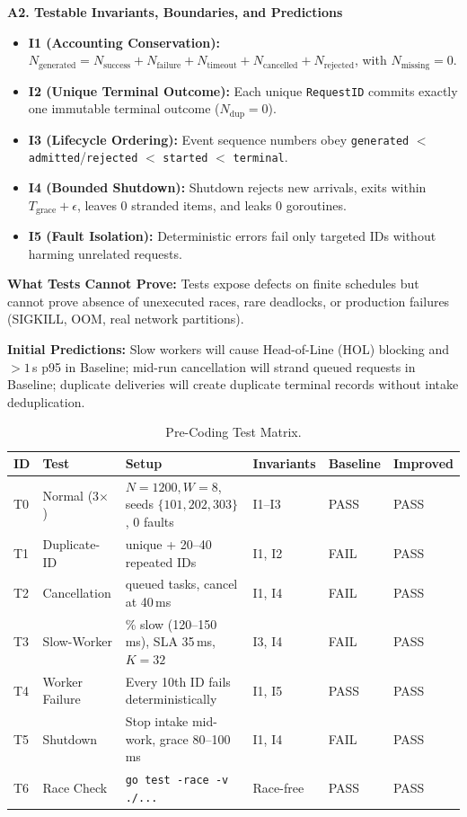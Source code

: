 \documentclass[11pt]{article}
\newcommand{\subhead}[1]{\vspace{0.6em}\noindent\textbf{\large #1}\par\vspace{0.25em}}
\begin{document}
\subhead{A2. Testable Invariants, Boundaries, and Predictions}
\begin{itemize}
    \item \textbf{I1 (Accounting Conservation):} $N_{\text{generated}} = N_{\text{success}} + N_{\text{failure}} + N_{\text{timeout}} + N_{\text{cancelled}} + N_{\text{rejected}}$, with $N_{\text{missing}} = 0$.
    \item \textbf{I2 (Unique Terminal Outcome):} Each unique \texttt{RequestID} commits exactly one immutable terminal outcome ($N_{\text{dup}} = 0$).
    \item \textbf{I3 (Lifecycle Ordering):} Event sequence numbers obey \texttt{generated} $<$ \texttt{admitted}/\texttt{rejected} $<$ \texttt{started} $<$ \texttt{terminal}.
    \item \textbf{I4 (Bounded Shutdown):} Shutdown rejects new arrivals, exits within $T_{\text{grace}}+\epsilon$, leaves 0 stranded items, and leaks 0 goroutines.
    \item \textbf{I5 (Fault Isolation):} Deterministic errors fail only targeted IDs without harming unrelated requests.
\end{itemize}

\textbf{What Tests Cannot Prove:} Tests expose defects on finite schedules but cannot prove absence of unexecuted races, rare deadlocks, or production failures (SIGKILL, OOM, real network partitions).

\textbf{Initial Predictions:} Slow workers will cause Head-of-Line (HOL) blocking and $>1$\,s p95 in Baseline; mid-run cancellation will strand queued requests in Baseline; duplicate deliveries will create duplicate terminal records without intake deduplication.

\begin{table}[htbp]
\centering
\caption{Pre-Coding Test Matrix.}
\footnotesize
\begin{tabularx}{\textwidth}{@{} l l >{\raggedright\arraybackslash}X l l l @{}}
\toprule
\textbf{ID} & \textbf{Test} & \textbf{Setup} & \textbf{Invariants} & \textbf{Baseline} & \textbf{Improved} \\
\midrule
T0 & Normal (3$\times$) & $N=1200, W=8$, seeds $\{101,202,303\}$, 0 faults & I1--I3 & PASS & PASS \\
T1 & Duplicate-ID & 100 unique + 20--40 repeated IDs & I1, I2 & FAIL & PASS \\
T2 & Cancellation & 250 queued tasks, cancel at 40\,ms & I1, I4 & FAIL & PASS \\
T3 & Slow-Worker & 20\% slow (120--150\,ms), SLA 35\,ms, $K=32$ & I3, I4 & FAIL & PASS \\
T4 & Worker Failure & Every 10th ID fails deterministically & I1, I5 & PASS & PASS \\
T5 & Shutdown & Stop intake mid-work, grace 80--100\,ms & I1, I4 & FAIL & PASS \\
T6 & Race Check & \texttt{go test -race -v ./...} & Race-free & PASS & PASS \\
\bottomrule
\end{tabularx}
\end{table}
\end{document}
